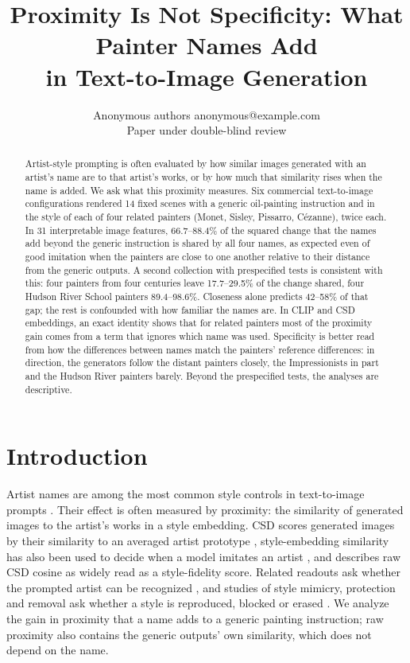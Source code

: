 \documentclass[10pt]{article}
\title{Proximity Is Not Specificity: What Painter Names Add\\in Text-to-Image Generation}
\author{\name Anonymous authors \email anonymous@example.com \\
      \addr Paper under double-blind review}
\begin{document}
\maketitle

\begin{abstract}
Artist-style prompting is often evaluated by how similar images generated with an artist's name
are to that artist's works, or by how much that similarity rises when the name is added. We ask
what this proximity measures. Six commercial text-to-image configurations rendered 14 fixed scenes
with a generic oil-painting instruction and in the style of each of four related painters (Monet,
Sisley, Pissarro, C\'ezanne), twice each. In 31 interpretable image features, 66.7--88.4\% of the
squared change that the names add beyond the generic instruction is shared by all four names, as
expected even of good imitation when the painters are close to one another relative to their
distance from the generic outputs. A second collection with prespecified tests is consistent with
this: four painters from four centuries leave 17.7--29.5\% of the change shared, four Hudson River
School painters 89.4--98.6\%. Closeness alone predicts 42--58\% of that gap; the rest is
confounded with how familiar the names are. In CLIP and CSD embeddings, an exact identity shows
that for related painters most of the proximity gain comes from a term that ignores which name was
used.
Specificity is better read from how the differences between names match the painters' reference
differences: in direction, the generators follow the distant painters closely, the Impressionists
in part and the Hudson River painters barely. Beyond the prespecified tests, the analyses are
descriptive.
\end{abstract}

\section{Introduction}\label{sec:intro}

Artist names are among the most common style controls in text-to-image prompts
\citep{wang2023diffusiondb}. Their effect is often measured by proximity: the similarity of
generated images to the artist's works in a style embedding. CSD scores generated images by their
similarity to an averaged artist prototype \citep{somepalli2024style}, style-embedding similarity
has also been used to decide when a model imitates an artist \citep{verma2025imitation}, and
\citet{frochte2026csd} describes raw CSD cosine as widely read as a style-fidelity score. Related
readouts ask whether the prompted artist can be recognized
\citep{casper2023measuring,su2025prompted,moayeri2025rethinking}, and studies of style mimicry,
protection and removal ask whether a style is reproduced, blocked or erased
\citep{shan2023glaze,honig2025adversarial,gandikota2023erasing,kumari2023ablating,zhang2024unlearncanvas}.
We analyze the gain in proximity that a name adds to a generic painting instruction; raw proximity
also contains the generic outputs' own similarity, which does not depend on the name.
\end{document}
